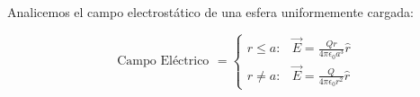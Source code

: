 \documentclass[a4paper,10pt]{article}
\begin{document}
Analicemos el campo electrostático de una esfera uniformemente cargada:

$$
\begin{array}{c}
\text{Campo Eléctrico}
\end{array}  = 
\left\{ \begin{array}{cc} %
r\leq a : & \vec{E}=\frac{Qr}{4\pi\epsilon_0 a^3}\hat r   \\
r\neq a : & \vec{E}=\frac{Q}{4\pi\epsilon_0 r^2}\hat r     \end{array} \right. 
$$
\end{document}
